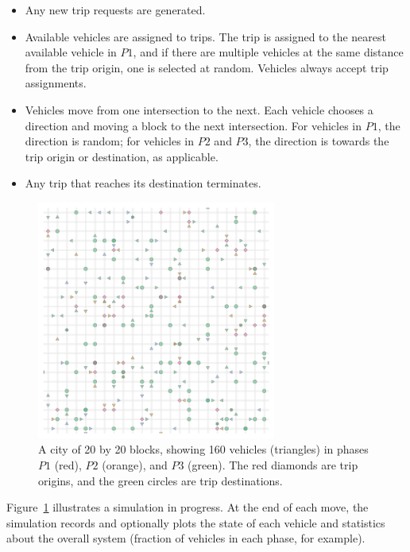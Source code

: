 \documentclass[
  letterpaper,
  DIV=11,
  numbers=noendperiod]{scrartcl}
\begin{document}
\begin{itemize}
\item
  Any new trip requests are generated.
\item
  Available vehicles are assigned to trips. The trip is assigned to the
  nearest available vehicle in \(P1\), and if there are multiple
  vehicles at the same distance from the trip origin, one is selected at
  random. Vehicles always accept trip assignments.
\item
  Vehicles move from one intersection to the next. Each vehicle chooses
  a direction and moving a block to the next intersection. For vehicles
  in \(P1\), the direction is random; for vehicles in \(P2\) and \(P3\),
  the direction is towards the trip origin or destination, as
  applicable.
\item
  Any trip that reaches its destination terminates.
\end{itemize}

\begin{figure}

{\centering \includegraphics[width=0.7\textwidth,height=\textheight]{fig2.png}

}

\caption{\label{fig-2}A city of 20 by 20 blocks, showing 160 vehicles
(triangles) in phases \(P1\) (red), \(P2\) (orange), and \(P3\) (green).
The red diamonds are trip origins, and the green circles are trip
destinations.}

\end{figure}

Figure~\ref{fig-2} illustrates a simulation in progress. At the end of
each move, the simulation records and optionally plots the state of each
vehicle and statistics about the overall system (fraction of vehicles in
each phase, for example).
\end{document}
